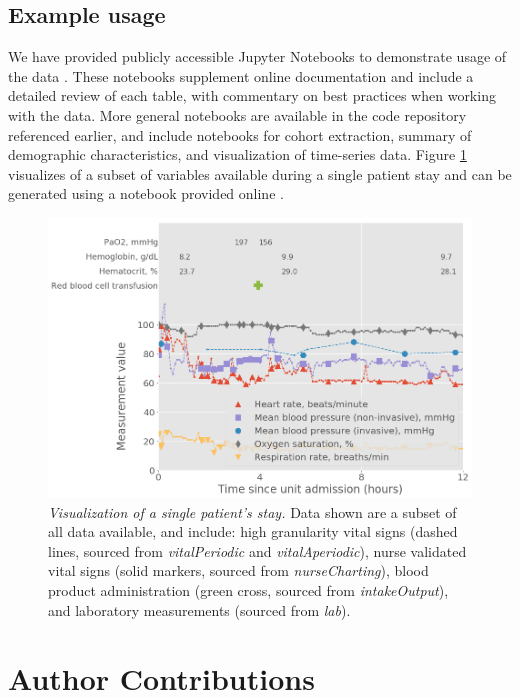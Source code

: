 \documentclass[english]{article}
\newcommand{\tblname}[1]{\emph{#1}}
\begin{document}
\subsection*{Example usage}\label{example-usage}

We have provided publicly accessible Jupyter Notebooks \cite{kluyver2016jupyter, pergra2007ipython} to demonstrate usage of the data \cite{eicu-data-paper}.
These notebooks supplement online documentation and include a detailed review of each table, with commentary on best practices when working with the data. More general notebooks are available in the code repository referenced earlier, and include notebooks for cohort extraction, summary of demographic characteristics, and visualization of time-series data. Figure \ref{fig:example_patient} visualizes of a subset of variables available during a single patient stay and can be generated using a notebook provided online \cite{eicu-data-paper}.

\begin{figure}[htbp]
\includegraphics[width=1.0\textwidth]{img/ExamplePatient.png}
\caption{\emph{Visualization of a single patient's stay.} Data shown are a subset of all data available, and include: high granularity vital signs (dashed lines, sourced from \tblname{vitalPeriodic} and \tblname{vitalAperiodic}), nurse validated vital signs (solid markers, sourced from \tblname{nurseCharting}), blood product administration (green cross, sourced from \tblname{intakeOutput}), and laboratory measurements (sourced from \tblname{lab}). \label{fig:example_patient}}
\end{figure}

\section*{Author Contributions}\label{authorcontributions}
\end{document}
